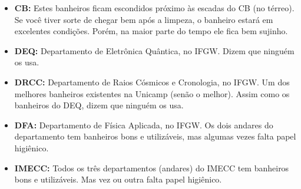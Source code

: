 \begin{itemize}
    \item  \textbf{CB:} Estes banheiros ficam escondidos próximo às escadas do
    CB (no térreo). Se você tiver sorte de chegar bem após a limpeza, o banheiro
    estará em excelentes condições. Porém, na maior parte do tempo ele fica bem
    sujinho.

    \item  \textbf{DEQ:} Departamento de Eletrônica Quântica, no IFGW. Dizem que
    ninguém os usa.

    \item  \textbf{DRCC:} Departamento de Raios Cósmicos e Cronologia, no IFGW.
    Um dos melhores banheiros existentes na Unicamp (senão o melhor). Assim como
    os banheiros do DEQ, dizem que ninguém os usa.

    \item  \textbf{DFA:} Departamento de Física Aplicada, no IFGW. Os dois
    andares do departamento tem banheiros bons e utilizáveis, mas algumas vezes
    falta papel higiênico.

    \item  \textbf{IMECC:} Todos os três departamentos (andares) do IMECC tem
    banheiros bons e utilizáveis. Mas vez ou outra falta papel higiênico.
\end{itemize}
